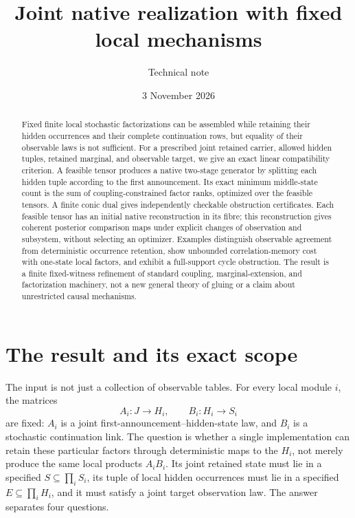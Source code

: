 \documentclass[11pt]{article}
\title{Joint native realization with fixed local mechanisms}
\author{Technical note}
\date{3 November 2026}
\theoremstyle{remark}
\begin{document}
\maketitle

\begin{abstract}
Fixed finite local stochastic factorizations can be assembled while retaining their hidden occurrences and their complete continuation rows, but equality of their observable laws is not sufficient. For a prescribed joint retained carrier, allowed hidden tuples, retained marginal, and observable target, we give an exact linear compatibility criterion. A feasible tensor produces a native two-stage generator by splitting each hidden tuple according to the first announcement. Its exact minimum middle-state count is the sum of coupling-constrained factor ranks, optimized over the feasible tensors. A finite conic dual gives independently checkable obstruction certificates. Each feasible tensor has an initial native reconstruction in its fibre; this reconstruction gives coherent posterior comparison maps under explicit changes of observation and subsystem, without selecting an optimizer. Examples distinguish observable agreement from deterministic occurrence retention, show unbounded correlation-memory cost with one-state local factors, and exhibit a full-support cycle obstruction. The result is a finite fixed-witness refinement of standard coupling, marginal-extension, and factorization machinery, not a new general theory of gluing or a claim about unrestricted causal mechanisms.
\end{abstract}

\section{The result and its exact scope}

The input is not just a collection of observable tables. For every local module $i$, the matrices
\[
 A_i:J\longrightarrow H_i,\qquad B_i:H_i\longrightarrow S_i
\]
are fixed: $A_i$ is a joint first-announcement--hidden-state law, and $B_i$ is a stochastic continuation link. The question is whether a single implementation can retain these particular factors through deterministic maps to the $H_i$, not merely produce the same local products $A_iB_i$. Its joint retained state must lie in a specified $S\subseteq\prod_iS_i$, its tuple of local hidden occurrences must lie in a specified $E\subseteq\prod_iH_i$, and it must satisfy a joint target observation law. The answer separates four questions.
\end{document}
